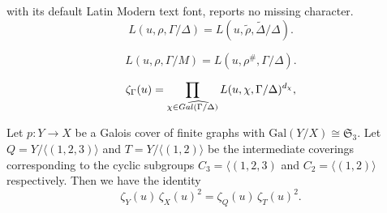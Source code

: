 \documentclass[10pt,a4paper]{amsart}
\begin{document}
with its default Latin Modern text font, reports no missing character.
 \begin{equation}
  \label{eq:Lfun1}
  L(u,\rho,\Gamma/\Delta) =  L(u, \widetilde{\rho}, \widetilde{\Delta}/\Delta).
 \end{equation}

 \begin{equation}
  \label{eq:Linducedrep}
  L(u, \rho, \Gamma/M) = L(u, \rho^\#, \Gamma/\Delta).  
 \end{equation}

 \begin{equation}
  \label{eq:zetafactorization}
  \zeta_\Gamma(u)
 =
 \prod_{\chi\in \widehat{{\rm Gal}(\Gamma/\Delta)}}
 L(u, \chi, \Gamma/\Delta)^{d_\chi},
 \end{equation}

\begin{thm}
\label{thm:zeta-relation-S3}
Let $p:Y\to X$ be a Galois cover of finite graphs with
$\mathrm{Gal}(Y/X)\cong {\mathfrak S}_3$.  Let
$Q=Y/\langle(1,2,3)\rangle$ and $T=Y/\langle(1,2)\rangle$ be the
intermediate coverings corresponding to the cyclic subgroups 
$C_3=\langle(1,2,3)$ and $C_2=\langle(1,2)\rangle$ respectively.  
Then we have the identity
\[
\zeta_Y(u)\,\zeta_X(u)^2 = \zeta_Q(u)\,\zeta_T(u)^2.
\]
\end{thm}
\end{document}
